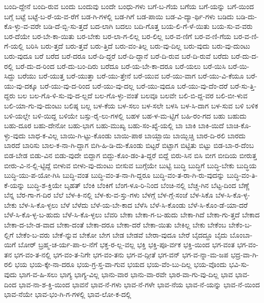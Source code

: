 {ಬಂದಿ-ದ್ದೇನೆ
ಬಂದಿ-ರುವ
ಬಂದು
ಬಂದುವು
ಬಂದೇ
ಬಂಧು-ಗಳು
ಬಗೆ-ಬ-ಗೆಯ
ಬಗೆಯ
ಬಗೆ-ಯನ್ನು
ಬಗೆ-ಯಿಂದ
ಬಗ್ಗೆ
ಬಟ್ಟೆ
ಬಟ್ಟೆ-ಬ-ರೆ-ಯ-ವ-ರೆಗೆ
ಬಡ-ಗಿ-ಗಳಲ್ಲಿ
ಬಡ-ಗಿಗೆ
ಬಡ-ಪಾಯಿ
ಬಡ-ವಿ-ದ್ಯಾ-ರ್ಥಿ-ಗಳು
ಬಡಿದು
ಬಡಿ-ದು-ಕೊ-ಳ್ಳು-ವ-ವರೇ
ಬಡಿ-ದೆ-ಬ್ಬಿ-ಸು-ತ್ತದೆ
ಬದ-ಲಾಗಿ
ಬದಲು
ಬದಿ-ಗೊತ್ತ
ಬಯ-ಲಿ-ಗೆ-ಳೆ-ಯಿತು
ಬಯ-ಸು-ವ-ವರು
ಬರ-ದೆಯೇ
ಬರ-ಬೇ-ಕಾ-ಯಿತು
ಬರ-ಬೇಕು
ಬರ-ಲಾ-ಗ-ಲಿಲ್ಲ
ಬರ-ಲಿಲ್ಲ
ಬರ-ವ-ಣಿಗೆ
ಬರ-ವ-ಣಿ-ಗೆಯ
ಬರ-ವ-ಣಿ-ಗೆ-ಯಲ್ಲಿ
ಬರಿಸಿ
ಬರು-ತ್ತದೆ
ಬರು-ತ್ತವೆ
ಬರು-ತ್ತಿದೆ
ಬರು-ವಂ-ತಿಲ್ಲ
ಬರು-ವು-ದಿಲ್ಲ
ಬರು-ವುದು
ಬರು-ವು-ದುಂಟು
ಬರು-ವುದೂ
ಬರೆ
ಬರೆದ
ಬರೆ-ದರೂ
ಬರೆ-ದಿ-ದ್ದರೆ
ಬರೆ-ದಿ-ದ್ದಾನೆ
ಬರೆ-ದಿ-ರುವ
ಬರೆ-ದಿ-ರುವೆ
ಬರೆದು
ಬರೆ-ದು-ದ-ರಲ್ಲಿ
ಬರೆ-ದು-ದ-ರಿಂದ
ಬರೆ-ದು-ಬಂ-ದಿರು
ಬರೆದೂ
ಬರೆ-ಯ-ಬೇ-ಕಾ-ದರೂ
ಬರೆ-ಯಲು
ಬರೆ-ಯಿಸಿ
ಬರೆ-ಯಿ-ಸಿದ್ದು
ಬರೆಯು
ಬರೆ-ಯುತ್ತ
ಬರೆ-ಯುತ್ತಾ
ಬರೆ-ಯು-ತ್ತೇನೆ
ಬರೆ-ಯುವ
ಬರೆ-ಯು-ವಾಗ
ಬರೆ-ಯು-ವಿ-ಕೆಯೂ
ಬರೆ-ಯು-ವು-ದಕ್ಕೂ
ಬರೆ-ಯು-ವು-ದ-ರಿಂದ
ಬರೆ-ಯು-ವು-ದಲ್ಲ
ಬರೆ-ಯು-ವುದೂ
ಬರೆ-ಯು-ವು-ದೆಂ-ದರೆ
ಬರೆ-ಸು-ತ್ತಿ-ದ್ದರು
ಬಲ
ಬಲ-ಗೊ-ಳಿ-ಸು-ವು-ದ-ಲ್ಲದೆ
ಬಲ-ಗೊ-ಳ್ಳು-ವಂತೆ
ಬಲವೂ
ಬಲವೇ
ಬಲಿ-ಬಿ-ದ್ದ-ವರ
ಬಲಿ-ಬೀ-ಳುವ
ಬಲಿ-ಯಾ-ಗು-ವು-ದುಂಟು
ಬಲಿಷ್ಠ
ಬಲ್ಲ
ಬಳ-ಕೆಯ
ಬಳ-ಸಲು
ಬಳ-ಸಲೇ
ಬಳಸಿ
ಬಳ-ಸಿ-ದಾಗ
ಬಳ-ಸುವ
ಬಳಿ
ಬಳಿಕ
ಬಳಿ-ಯಲ್ಲೇ
ಬಳಿ-ಯಿದ್ದ
ಬಳಿಯೇ
ಬಸ್ಸು-ರೈ-ಲು-ಗಳಲ್ಲಿ
ಬಹಳ
ಬಹ-ಳ-ಮ-ಟ್ಟಿಗೆ
ಬಹಿ-ರಂ-ಗದ
ಬಹು
ಬಹುದು
ಬಹು-ದೂರ
ಬಹು-ದೇನೋ
ಬಹು-ಭಾಗ
ಬಹು-ಮುಖ್ಯ
ಬಹು-ಸಂ-ಖ್ಯೆ-ಯಲ್ಲಿ
ಬಾ
ಬಾಕಿ
ಬಾಕಿ-ಯಿದೆ
ಬಾಚಿ-ಕೊ-ಳ್ಳು-ವುದು
ಬಾಧ-ಕ-ವಿಲ್ಲ
ಬಾಯಿ-ಗಿ-ಟ್ಟು-ಕೊಂಡು
ಬಾಯಿ-ಪಾಠ
ಬಾಯ್ಬಾಯಿ
ಬಾಯ್ಬಿಚ್ಚಿ
ಬಾರ-ದಿ-ರಲಿ
ಬಾರದು
ಬಾರದೆ
ಬಾರಿಸು
ಬಾಲ-ಕ-ನಾ-ಗಿ-ದ್ದಾಗ
ಬಿಗಿ-ಹಿ-ಡಿ-ದು-ಕೊಂಡು
ಬಿಟ್ಟರೆ
ಬಿಟ್ಟಾಗ
ಬಿಟ್ಟಿತು
ಬಿಟ್ಟು
ಬಿಡ-ಬಾ-ರ-ದೆಂಬ
ಬಿಡ-ಬೇಡ
ಬಿಡು-ವಿನ
ಬಿಡು-ವುದೇ
ಬಿದ್ದಾಗ
ಬಿದ್ದು-ಕೊಂ-ಡಂ-ತಿ-ದ್ದರೆ
ಬಿದ್ದೆ
ಬಿರು-ಸಿನ
ಬಿಸಿ
ಬೀಗ
ಬೀದಿಯ
ಬೀರುತ್ತ
ಬೀರು-ವಿ-ನ-ಲ್ಲಿ-ಟ್ಟಿದ್ದೆ
ಬೀಳುವ
ಬೀಳು-ವು-ದುಂಟು
ಬೀಸುವ
ಬುಗ್ಗೆಯೇ
ಬುಟ್ಟಿ
ಬುದ್ಧಿ
ಬುದ್ಧಿಗೆ
ಬುದ್ಧಿ-ಬೇಕು
ಬುದ್ಧಿಯ
ಬುದ್ಧಿ-ಯು-ಪ-ಯೋ-ಗಿಸಿ
ಬುದ್ಧಿ-ವಂತ
ಬುದ್ಧಿ-ವಂ-ತ-ನಾ-ಗಿ-ದ್ದರೂ
ಬುದ್ಧಿ-ವಂ-ತ-ರಾ-ಗಿ-ರು-ವುದನ್ನು
ಬುದ್ಧಿ-ವಂ-ತಿ-ಕೆ-ಯನ್ನು
ಬುದ್ಧಿ-ಶ-ಕ್ತಿಯೇ
ಬೃಹತ್
ಬೆಂಕಿ
ಬೆಂಕಿಗೆ
ಬೆಂಗ-ಳೂ-ರಿ-ನಿಂದ
ಬೆಂಚಿ-ನಲ್ಲಿ
ಬೆಚ್ಚ-ಗಿನ
ಬೆಟ್ಟ-ದಿಂದ
ಬೆಣ್ಣೆ
ಬೆನ್ನ
ಬೆರ-ಗಾ-ಗ-ದಿರ
ಬೆಲೆ
ಬೆಳ-ಕಿ-ನಲ್ಲಿ
ಬೆಳ-ಕು-ವ-ಸ್ತು-ಗಳು
ಬೆಳಗ್ಗೆ
ಬೆಳ-ಗ್ಗೆ-ಸಂಜೆ
ಬೆಳ-ಸಿಕೊ
ಬೆಳ-ಸಿ-ಕೊ-ಳ್ಳ-ಬೇಕು
ಬೆಳ-ಸಿ-ಕೊ-ಳ್ಳಲು
ಬೆಳೆ
ಬೆಳೆದು
ಬೆಳೆ-ಯ-ಬೇ-ಕಾದ
ಬೆಳೆಸಿ
ಬೆಳೆ-ಸಿ-ಕೊಂಡು
ಬೆಳೆ-ಸಿ-ಕೊಂ-ಡೆ-ಯಾ-ದರೆ
ಬೆಳೆ-ಸಿ-ಕೊ-ಳ್ಳ-ಬ-ಹುದು
ಬೆಳೆ-ಸಿ-ಕೊ-ಳ್ಳಲು
ಬೆವರಿ
ಬೇಕಾ
ಬೇಕಾ-ಗ-ಬ-ಹುದು
ಬೇಕಾ-ಗಿದೆ
ಬೇಕಾ-ಗು-ತ್ತದೆ
ಬೇಕಾದ
ಬೇಕಾ-ದ-ಬೇ-ಡ-ವಾದ
ಬೇಕಾ-ದಂತೆ
ಬೇಕಾ-ದರೂ
ಬೇಕಾ-ದರೆ
ಬೇಕಾ-ಯಿತು
ಬೇಕಿಲ್ಲ
ಬೇಕು
ಬೇಕೆಂಬ
ಬೇಕೆಂ-ಬ-ಲ್ಲಿಗೆ
ಬೇಕೆಂ-ಬ-ವರು
ಬೇಕೆ-ನ್ನುವ
ಬೇಕೋ
ಬೇಗ
ಬೇಡ
ಬೇಡವೆ
ಬೇರಾ-ವುದೂ
ಬೇರೆ
ಬೈದದ್ದೂ
ಬೈದು
ಬೊಂಬಾ-ಯಿಗೆ
ಬೋರ್
ಬ್ರಹ್ಮ-ಚ-ರ್ಯ-ಪಾ-ಲ-ನೆಗೆ
ಭಕ್ತ-ರ-ಲ್ಲ-ವಲ್ಲ
ಭಕ್ತಿ
ಭಕ್ತಿ-ಪೂ-ರ್ವಕ
ಭಕ್ತಿ-ಯಿಂದ
ಭಗ-ವಂತ
ಭಗ-ವಂ-ತನ
ಭಗ-ವಂ-ತ-ನಲ್ಲಿ
ಭಗ-ವಂ-ತ-ನಿಗೇ
ಭಗ-ವಂ-ತನು
ಭಗ-ವ-ದ್ಗೀತೆ
ಭಗ-ವನ್
ಭಗ-ವ-ನ್ನಾ-ಮ-ಜಪ
ಭದ್ರ-ವಾ-ಗಿ-ರಲಿ
ಭಯ
ಭಯ-ಕ್ಕೇ-ನಾ-ದರೂ
ಭಯ-ಗ್ರ-ಸ್ತ-ವಾ-ಗುವ
ಭಯದ
ಭಯ-ವೆಂ-ಬು-ದಿಲ್ಲ
ಭಯ-ವೊಂದು
ಭವಿ-ಸು-ವುದು
ಭಾಗ-ವ-ಹಿ-ಸಲು
ಭಾಗ್ಯ
ಭಾಗ್ಯ-ವಿಲ್ಲ
ಭಾನು-ವಾರ
ಭಾನು-ವಾ-ರವೇ
ಭಾರ-ವಾ-ಗು-ವು-ದಿಲ್ಲ
ಭಾವ
ಭಾವ-ದಿಂದ
ಭಾವ-ನಾ-ಶ-ಕ್ತಿ-ಯಿಂದ
ಭಾವನೆ
ಭಾವ-ನೆ-ಗಳು
ಭಾವ-ನೆ-ಗಳೇ
ಭಾವ-ನೆಯ
ಭಾವ-ನೆ-ಯನ್ನು
ಭಾವ-ನೆ-ಯಿಂದ
ಭಾವ-ನೆಯೇ
ಭಾವ-ಭಂ-ಗಿ-ಗ-ಗಳಲ್ಲಿ
ಭಾವ-ಲೋ-ಕ-ದಲ್ಲಿ
}
